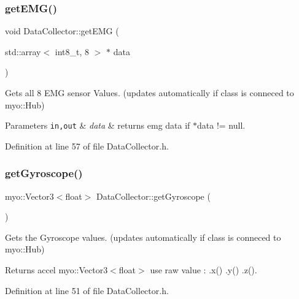 \subsubsection{\texorpdfstring{get\+E\+M\+G()}{getEMG()}}
{\footnotesize\ttfamily void Data\+Collector\+::get\+E\+MG (\begin{DoxyParamCaption}\item[{std\+::array$<$ int8\+\_\+t, 8 $>$ $\ast$}]{data }\end{DoxyParamCaption})\hspace{0.3cm}{\ttfamily [inline]}}



Gets all 8 E\+MG sensor Values. (updates automatically if class is conneced to myo\+::\+Hub) 


\begin{DoxyParams}[1]{Parameters}
\mbox{\tt in,out}  & {\em data} & returns emg data if $\ast$data != null. \\
\hline
\end{DoxyParams}


Definition at line 57 of file Data\+Collector.\+h.

\mbox{\label{class_data_collector_a04ad19d96b8574ff7c9f945cd1c5ddc6}} 
\subsubsection{\texorpdfstring{get\+Gyroscope()}{getGyroscope()}}
{\footnotesize\ttfamily myo\+::\+Vector3$<$float$>$ Data\+Collector\+::get\+Gyroscope (\begin{DoxyParamCaption}{ }\end{DoxyParamCaption})\hspace{0.3cm}{\ttfamily [inline]}}



Gets the Gyroscope values. (updates automatically if class is conneced to myo\+::\+Hub) 

\begin{DoxyReturn}{Returns}
accel myo\+::\+Vector3$<$float$>$ use raw value \+: .x() .y() .z(). 
\end{DoxyReturn}


Definition at line 51 of file Data\+Collector.\+h.

\mbox{\label{class_data_collector_a46a7e8adb8679fde1021fe89ed0d0be0}} 
